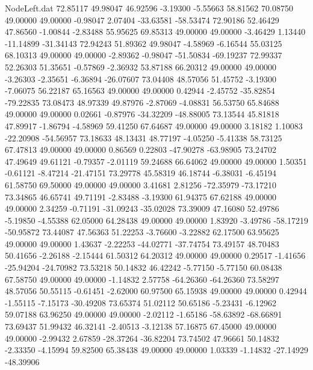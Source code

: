 \begin{filecontents}{NodeLeft.dat}
  72.85117   49.98047   46.92596    -3.19300   -5.55663   58.81562   70.08750   49.00000   49.00000   -0.98047    2.07404  -33.63581  -58.53474
  72.90186   52.46429   47.86560    -1.00844   -2.83488   55.95625   69.85313   49.00000   49.00000   -3.46429    1.13440  -11.14899  -31.34143
  72.94243   51.89362   49.98047    -4.58969   -6.16544   55.03125   68.10313   49.00000   49.00000   -2.89362   -0.98047  -51.50834  -69.19237
  72.99337   52.26303   51.35651    -0.57869   -2.36932   53.87188   66.20312   49.00000   49.00000   -3.26303   -2.35651   -6.36894  -26.07607
  73.04408   48.57056   51.45752    -3.19300   -7.06075   56.22187   65.16563   49.00000   49.00000    0.42944   -2.45752  -35.82854  -79.22835
  73.08473   48.97339   49.87976    -2.87069   -4.08831   56.53750   65.84688   49.00000   49.00000    0.02661   -0.87976  -34.32209  -48.88005
  73.13544   45.81818   47.89917    -1.86794   -4.58969   59.41250   67.64687   49.00000   49.00000    3.18182    1.10083  -22.20908  -54.56957
  73.18633   48.13431   48.77197    -4.05250   -5.41338   58.73125   67.47813   49.00000   49.00000    0.86569    0.22803  -47.90278  -63.98905
  73.24702   47.49649   49.61121    -0.79357   -2.01119   59.24688   66.64062   49.00000   49.00000    1.50351   -0.61121   -8.47214  -21.47151
  73.29778   45.58319   46.18744    -6.38031   -6.45194   61.58750   69.50000   49.00000   49.00000    3.41681    2.81256  -72.35979  -73.17210
  73.34865   46.65741   49.71191    -2.83488   -3.19300   61.94375   67.62188   49.00000   49.00000    2.34259   -0.71191  -31.09243  -35.02028
  73.39009   47.16080   52.49786    -5.19850   -4.55388   62.05000   64.28438   49.00000   49.00000    1.83920   -3.49786  -58.17219  -50.95872
  73.44087   47.56363   51.22253    -3.76600   -3.22882   62.17500   63.95625   49.00000   49.00000    1.43637   -2.22253  -44.02771  -37.74754
  73.49157   48.70483   50.41656    -2.26188   -2.15444   61.50312   64.20312   49.00000   49.00000    0.29517   -1.41656  -25.94204  -24.70982
  73.53218   50.14832   46.42242    -5.77150   -5.77150   60.08438   67.58750   49.00000   49.00000   -1.14832    2.57758  -64.26360  -64.26360
  73.58297   48.57056   50.55115    -0.61451   -2.62000   60.97500   65.15938   49.00000   49.00000    0.42944   -1.55115   -7.15173  -30.49208
  73.65374   51.02112   50.65186    -5.23431   -6.12962   59.07188   63.96250   49.00000   49.00000   -2.02112   -1.65186  -58.63892  -68.66891
  73.69437   51.99432   46.32141    -2.40513   -3.12138   57.16875   67.45000   49.00000   49.00000   -2.99432    2.67859  -28.37264  -36.82204
  73.74502   47.96661   50.14832    -2.33350   -4.15994   59.82500   65.38438   49.00000   49.00000    1.03339   -1.14832  -27.14929  -48.39906

\end{filecontents}
